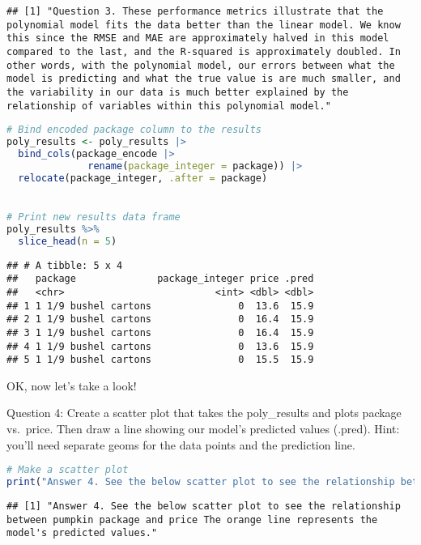 \documentclass[
]{article}
\begin{document}
\begin{lstlisting}
## [1] "Question 3. These performance metrics illustrate that the polynomial model fits the data better than the linear model. We know this since the RMSE and MAE are approximately halved in this model compared to the last, and the R-squared is approximately doubled. In other words, with the polynomial model, our errors between what the model is predicting and what the true value is are much smaller, and the variability in our data is much better explained by the relationship of variables within this polynomial model."
\end{lstlisting}

\begin{lstlisting}[language=R]
# Bind encoded package column to the results
poly_results <- poly_results |>  
  bind_cols(package_encode |> 
              rename(package_integer = package)) |>  
  relocate(package_integer, .after = package)


# Print new results data frame
poly_results %>% 
  slice_head(n = 5)
\end{lstlisting}

\begin{lstlisting}
## # A tibble: 5 x 4
##   package              package_integer price .pred
##   <chr>                          <int> <dbl> <dbl>
## 1 1 1/9 bushel cartons               0  13.6  15.9
## 2 1 1/9 bushel cartons               0  16.4  15.9
## 3 1 1/9 bushel cartons               0  16.4  15.9
## 4 1 1/9 bushel cartons               0  13.6  15.9
## 5 1 1/9 bushel cartons               0  15.5  15.9
\end{lstlisting}

OK, now let's take a look!

Question 4: Create a scatter plot that takes the poly\_results and plots
package vs.~price. Then draw a line showing our model's predicted values
(.pred). Hint: you'll need separate geoms for the data points and the
prediction line.

\begin{lstlisting}[language=R]
# Make a scatter plot
print("Answer 4. See the below scatter plot to see the relationship between pumpkin package and price The orange line represents the model's predicted values.")
\end{lstlisting}

\begin{lstlisting}
## [1] "Answer 4. See the below scatter plot to see the relationship between pumpkin package and price The orange line represents the model's predicted values."
\end{lstlisting}
\end{document}
